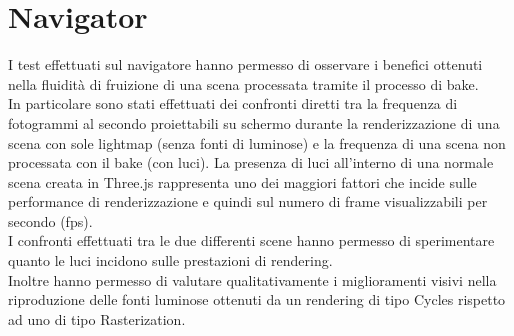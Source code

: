 \section{Navigator}

\label{sec:chapter_prove_sperimentali_navigator}
I test effettuati sul navigatore hanno permesso di osservare i benefici ottenuti nella fluidità di fruizione di una scena processata tramite il processo di  bake.
\\
In particolare sono stati effettuati dei confronti diretti tra la frequenza di fotogrammi al secondo proiettabili su schermo durante la renderizzazione di una scena con sole lightmap (senza fonti di luminose) e la frequenza di una scena non processata con il bake (con luci).
La presenza di luci all’interno di una normale scena creata in Three.js rappresenta uno dei maggiori fattori che incide sulle performance di renderizzazione e quindi sul numero di frame visualizzabili per secondo (fps).
\\
I confronti effettuati tra le due differenti scene hanno permesso di sperimentare quanto le luci incidono sulle prestazioni di rendering.
\\ 
Inoltre hanno permesso di valutare qualitativamente i miglioramenti visivi nella riproduzione delle fonti luminose ottenuti da un rendering di tipo Cycles rispetto ad uno di tipo Rasterization.

